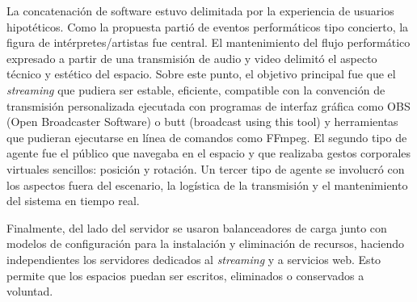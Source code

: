 

La concatenación de software estuvo delimitada por la experiencia de usuarios hipotéticos. Como la propuesta partió de eventos performáticos tipo concierto, la figura de intérpretes/artistas fue central. El mantenimiento del flujo performático expresado a partir de una transmisión de audio y video delimitó el aspecto técnico y estético del espacio. Sobre este punto, el objetivo principal fue que el \textit{streaming} que pudiera ser estable, eficiente, compatible con la convención de transmisión personalizada ejecutada con programas de interfaz gráfica como OBS (Open Broadcaster Software) o butt (broadcast using this tool) y herramientas que pudieran ejecutarse en línea de comandos como FFmpeg. El segundo tipo de agente fue el público que navegaba en el espacio y que realizaba gestos corporales virtuales sencillos: posición y rotación. Un tercer tipo de agente se involucró con los aspectos fuera del escenario, la logística de la transmisión y el mantenimiento del sistema en tiempo real. 


Finalmente, del lado del servidor se usaron balanceadores de carga junto con modelos de configuración para la instalación y eliminación de recursos, haciendo independientes los servidores dedicados al \textit{streaming} y a servicios web. Esto permite que los espacios puedan ser escritos, eliminados o conservados a voluntad. 
